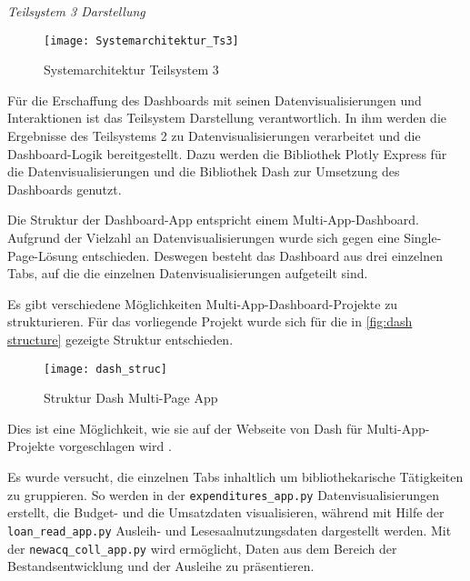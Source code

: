     \noindent
    \textit{Teilsystem 3 Darstellung}\\

    \begin{figure}[H]
        \centering
            \texttt{[image: Systemarchitektur\_Ts3]}
            \caption{Systemarchitektur Teilsystem 3}
            \label{fig:Systemarchitektur Teilsystem 3}
    \end{figure}

    Für die Erschaffung des Dashboards mit seinen Datenvisualisierungen und Interaktionen ist das Teilsystem Darstellung verantwortlich.
    In ihm werden die Ergebnisse des Teilsystems 2 zu Datenvisualisierungen verarbeitet und die Dashboard-Logik bereitgestellt.
    Dazu werden die Bibliothek Plotly Express für die Datenvisualisierungen und die Bibliothek Dash zur Umsetzung des Dashboards genutzt. 
    
    Die Struktur der Dashboard-App entspricht einem Multi-App-Dashboard.
    Aufgrund der Vielzahl an Datenvisualisierungen wurde sich gegen eine Single-Page-Lösung entschieden. Deswegen besteht das Dashboard
    aus drei einzelnen Tabs, auf die die einzelnen Datenvisualisierungen aufgeteilt sind.
    
    Es gibt verschiedene Möglichkeiten Multi-App-Dashboard-Projekte zu strukturieren. Für das vorliegende Projekt wurde sich für die in 
    \autoref{fig:dash structure} gezeigte Struktur entschieden.

    \begin{figure}[H]
        \centering
            \texttt{[image: dash\_struc]}
            \caption{Struktur Dash Multi-Page App}
            \label{fig:dash structure}
    \end{figure}
    
    Dies ist eine Möglichkeit, wie sie auf der Webseite von Dash für Multi-App-Projekte vorgeschlagen wird \cite[vgl.][]{plotly_url_2021}.
    
    Es wurde versucht, die einzelnen Tabs inhaltlich um bibliothekarische Tätigkeiten zu gruppieren. So werden in der \texttt{expenditures\_app.py}
    Datenvisualisierungen erstellt, die Budget- und die Umsatzdaten visualisieren, während mit Hilfe der \texttt{loan\_read\_app.py}
    Ausleih- und Lesesaalnutzungsdaten dargestellt werden. Mit der \texttt{newacq\_coll\_app.py} wird ermöglicht, Daten aus dem Bereich der Bestandsentwicklung und der 
    Ausleihe zu präsentieren.

